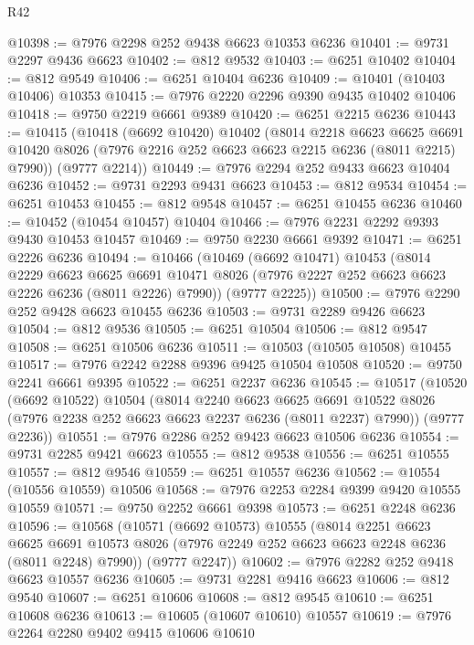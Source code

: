 \begin{lexlean}{R42}
\begin{coremodule}
{@10398 := @7976 @2298 @252 @9438 @6623 @10353 @6236
@10401 := @9731 @2297 @9436 @6623
@10402 := @812 @9532
@10403 := @6251 @10402
@10404 := @812 @9549
@10406 := @6251 @10404 @6236
@10409 := @10401 (@10403 @10406) @10353
@10415 := @7976 @2220 @2296 @9390 @9435 @10402 @10406
@10418 := @9750 @2219 @6661 @9389
@10420 := @6251 @2215 @6236
@10443 := @10415
    (@10418
      (@6692 @10420)
      @10402
      (@8014
        @2218
        @6623
        @6625
        @6691
        @10420
        @8026
        (@7976 @2216 @252 @6623 @6623 @2215 @6236 (@8011 @2215) @7990))
      (@9777 @2214))
@10449 := @7976 @2294 @252 @9433 @6623 @10404 @6236
@10452 := @9731 @2293 @9431 @6623
@10453 := @812 @9534
@10454 := @6251 @10453
@10455 := @812 @9548
@10457 := @6251 @10455 @6236
@10460 := @10452 (@10454 @10457) @10404
@10466 := @7976 @2231 @2292 @9393 @9430 @10453 @10457
@10469 := @9750 @2230 @6661 @9392
@10471 := @6251 @2226 @6236
@10494 := @10466
    (@10469
      (@6692 @10471)
      @10453
      (@8014
        @2229
        @6623
        @6625
        @6691
        @10471
        @8026
        (@7976 @2227 @252 @6623 @6623 @2226 @6236 (@8011 @2226) @7990))
      (@9777 @2225))
@10500 := @7976 @2290 @252 @9428 @6623 @10455 @6236
@10503 := @9731 @2289 @9426 @6623
@10504 := @812 @9536
@10505 := @6251 @10504
@10506 := @812 @9547
@10508 := @6251 @10506 @6236
@10511 := @10503 (@10505 @10508) @10455
@10517 := @7976 @2242 @2288 @9396 @9425 @10504 @10508
@10520 := @9750 @2241 @6661 @9395
@10522 := @6251 @2237 @6236
@10545 := @10517
    (@10520
      (@6692 @10522)
      @10504
      (@8014
        @2240
        @6623
        @6625
        @6691
        @10522
        @8026
        (@7976 @2238 @252 @6623 @6623 @2237 @6236 (@8011 @2237) @7990))
      (@9777 @2236))
@10551 := @7976 @2286 @252 @9423 @6623 @10506 @6236
@10554 := @9731 @2285 @9421 @6623
@10555 := @812 @9538
@10556 := @6251 @10555
@10557 := @812 @9546
@10559 := @6251 @10557 @6236
@10562 := @10554 (@10556 @10559) @10506
@10568 := @7976 @2253 @2284 @9399 @9420 @10555 @10559
@10571 := @9750 @2252 @6661 @9398
@10573 := @6251 @2248 @6236
@10596 := @10568
    (@10571
      (@6692 @10573)
      @10555
      (@8014
        @2251
        @6623
        @6625
        @6691
        @10573
        @8026
        (@7976 @2249 @252 @6623 @6623 @2248 @6236 (@8011 @2248) @7990))
      (@9777 @2247))
@10602 := @7976 @2282 @252 @9418 @6623 @10557 @6236
@10605 := @9731 @2281 @9416 @6623
@10606 := @812 @9540
@10607 := @6251 @10606
@10608 := @812 @9545
@10610 := @6251 @10608 @6236
@10613 := @10605 (@10607 @10610) @10557
@10619 := @7976 @2264 @2280 @9402 @9415 @10606 @10610
}
\end{coremodule}
\end{lexlean}
